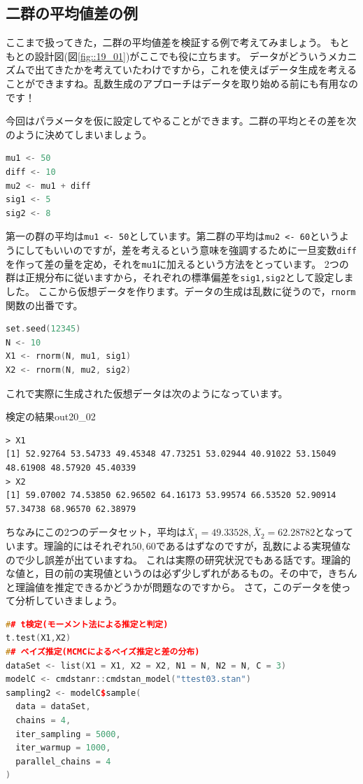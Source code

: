\documentclass{ltjsbook}
\begin{document}
\subsection{二群の平均値差の例}
ここまで扱ってきた，二群の平均値差を検証する例で考えてみましょう。
もともとの設計図(図\ref{fig::19_01})がここでも役に立ちます。
データがどういうメカニズムで出てきたかを考えていたわけですから，これを使えばデータ生成を考えることができますね。乱数生成のアプローチはデータを取り始める前にも有用なのです！

今回はパラメータを仮に設定してやることができます。二群の平均とその差を次のように決めてしまいましょう。
\begin{lstlisting}[language=c++,label={code::20_02},caption={平均値差の設定}]
mu1 <- 50
diff <- 10
mu2 <- mu1 + diff
sig1 <- 5
sig2 <- 8
\end{lstlisting}

第一の群の平均は\verb|mu1 <- 50|としています。第二群の平均は\verb|mu2 <- 60|というようにしてもいいのですが，差を考えるという意味を強調するために一旦変数\verb|diff|を作って差の量を定め，それを\verb|mu1|に加えるという方法をとっています。
2つの群は正規分布に従いますから，それぞれの標準偏差を\verb|sig1,sig2|として設定しました。
ここから仮想データを作ります。データの生成は乱数に従うので，\verb|rnorm|関数の出番です。
\begin{lstlisting}[language=c++,label={code::20_03},caption={仮想データの生成}]
set.seed(12345)
N <- 10
X1 <- rnorm(N, mu1, sig1)
X2 <- rnorm(N, mu2, sig2)
\end{lstlisting}
これで実際に生成された仮想データは次のようになっています。
\begin{Rscreen}{検定の結果}{out20_02}
\begin{verbatim}
> X1
[1] 52.92764 53.54733 49.45348 47.73251 53.02944 40.91022 53.15049 48.61908 48.57920 45.40339
> X2
[1] 59.07002 74.53850 62.96502 64.16173 53.99574 66.53520 52.90914 57.34738 68.96570 62.38979
\end{verbatim}
\end{Rscreen}
ちなみにこの2つのデータセット，平均は$\bar{X}_1=49.33528,\bar{X}_2=62.28782$となっています。理論的にはそれぞれ$50,60$であるはずなのですが，乱数による実現値なので少し誤差が出ていますね。
これは実際の研究状況でもある話です。理論的な値と，目の前の実現値というのは必ず少しずれがあるもの。その中で，きちんと理論値を推定できるかどうかが問題なのですから。
さて，このデータを使って分析していきましょう。
\begin{lstlisting}[language=c++,label={code::20_04},caption={パラメータリカバリ・検証}]
## t検定(モーメント法による推定と判定)
t.test(X1,X2)
## ベイズ推定(MCMCによるベイズ推定と差の分布)
dataSet <- list(X1 = X1, X2 = X2, N1 = N, N2 = N, C = 3)
modelC <- cmdstanr::cmdstan_model("ttest03.stan")
sampling2 <- modelC$sample(
  data = dataSet,
  chains = 4,
  iter_sampling = 5000,
  iter_warmup = 1000,
  parallel_chains = 4
)
\end{lstlisting}
\end{document}
